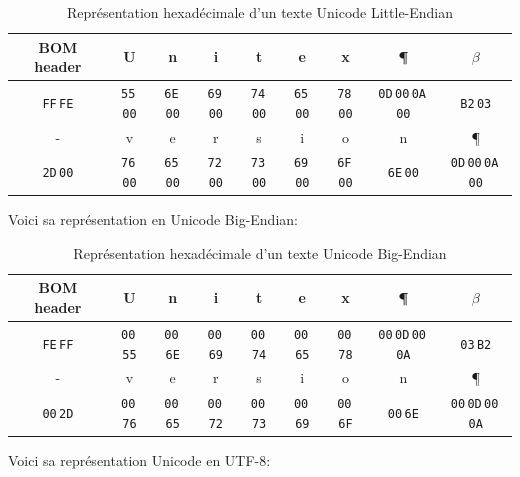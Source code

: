 \bigskip
\begin{table}[!h]
\begin{center}
\begin{tabular}{|c|c|c|c|c|c|c|c|c|}
\hline
BOM header & U & n & i & t & e & x & \P & $\beta$
\\
\hline
\verb+FF+\,\verb+FE+ & \verb+55+\,\verb+00+ & \verb+6E+\,\verb+00+ & \verb+69+\,\verb+00+ & \verb+74+\,\verb+00+ & \verb+65+\,\verb+00+ & \verb+78+\,\verb+00+
& \verb+0D+\,\verb+00+\,\verb+0A+\,\verb+00+ & \verb+B2+\,\verb+03+
\\
\hline
\hline
- & v & e & r & s & i & o & n & \P
\\
\hline
\verb+2D+\,\verb+00+ & \verb+76+\,\verb+00+ & \verb+65+\,\verb+00+ & \verb+72+\,\verb+00+ & \verb+73+\,\verb+00+ & \verb+69+\,\verb+00+ & \verb+6F+\,\verb+00+
& \verb+6E+\,\verb+00+ & \verb+0D+\,\verb+00+\,\verb+0A+\,\verb+00+
\\
\hline
\end{tabular}
\caption{Représentation hexadécimale d’un texte Unicode Little-Endian}
\end{center}
\end{table}
\pagebreak
\bigskip
\noindent Voici sa représentation en Unicode Big-Endian:

\bigskip
\begin{table}[!h]
\begin{center}
\begin{tabular}{|c|c|c|c|c|c|c|c|c|}
\hline
BOM header & U & n & i & t & e & x & \P & $\beta$
\\
\hline
\verb+FE+\,\verb+FF+ & \verb+00+\,\verb+55+ & \verb+00+\,\verb+6E+ & \verb+00+\,\verb+69+ & \verb+00+\,\verb+74+ & \verb+00+\,\verb+65+ & \verb+00+\,\verb+78+
& \verb+00+\,\verb+0D+\,\verb+00+\,\verb+0A+ & \verb+03+\,\verb+B2+
\\
\hline
\hline
- & v & e & r & s & i & o & n & \P
\\
\hline
\verb+00+\,\verb+2D+ & \verb+00+\,\verb+76+ & \verb+00+\,\verb+65+ & \verb+00+\,\verb+72+ & \verb+00+\,\verb+73+ & \verb+00+\,\verb+69+ & \verb+00+\,\verb+6F+
& \verb+00+\,\verb+6E+ & \verb+00+\,\verb+0D+\,\verb+00+\,\verb+0A+
\\
\hline
\end{tabular}
\caption{Représentation hexadécimale d’un texte Unicode Big-Endian}
\end{center}
\end{table}

\bigskip
\noindent Voici sa représentation Unicode en UTF-8:

